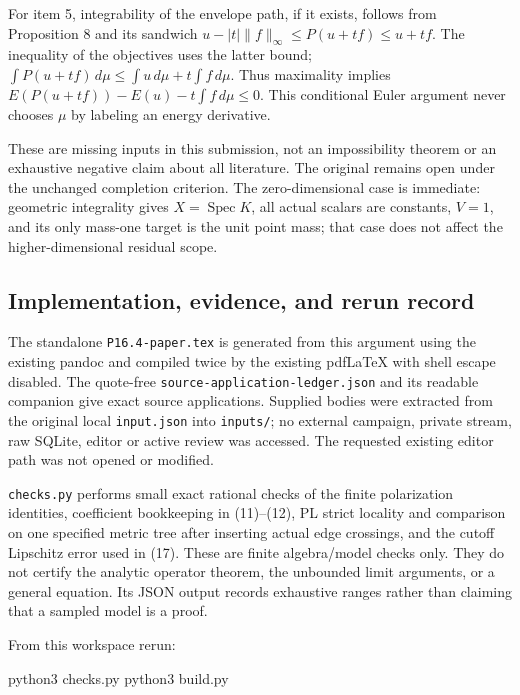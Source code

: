\documentclass[
]{article}
\newenvironment{Shaded}{}{}
\newcommand{\ExtensionTok}[1]{#1}
\newcommand{\NormalTok}[1]{#1}
\begin{document}
For item 5, integrability of the envelope path, if it exists, follows
from Proposition 8 and its sandwich
\(u-|t|\|f\|_\infty\leq P(u+tf)\leq u+tf\). The inequality of the
objectives uses the latter bound;
\(\int P(u+tf)\,d\mu\leq\int u\,d\mu+t\int f\,d\mu\). Thus maximality
implies \(E(P(u+tf))-E(u)-t\int f\,d\mu\leq0\). This conditional Euler
argument never chooses \(\mu\) by labeling an energy derivative.

These are missing inputs in this submission, not an impossibility
theorem or an exhaustive negative claim about all literature. The
original remains open under the unchanged completion criterion. The
zero-dimensional case is immediate: geometric integrality gives
\(X=\operatorname{Spec}K\), all actual scalars are constants, \(V=1\),
and its only mass-one target is the unit point mass; that case does not
affect the higher-dimensional residual scope.

\subsection{Implementation, evidence, and rerun
record}\label{implementation-evidence-and-rerun-record}

The standalone \texttt{P16.4-paper.tex} is generated from this argument
using the existing pandoc and compiled twice by the existing pdfLaTeX
with shell escape disabled. The quote-free
\texttt{source-application-ledger.json} and its readable companion give
exact source applications. Supplied bodies were extracted from the
original local \texttt{input.json} into \texttt{inputs/}; no external
campaign, private stream, raw SQLite, editor or active review was
accessed. The requested existing editor path was not opened or modified.

\texttt{checks.py} performs small exact rational checks of the finite
polarization identities, coefficient bookkeeping in (11)--(12), PL
strict locality and comparison on one specified metric tree after
inserting actual edge crossings, and the cutoff Lipschitz error used in
(17). These are finite algebra/model checks only. They do not certify
the analytic operator theorem, the unbounded limit arguments, or a
general equation. Its JSON output records exhaustive ranges rather than
claiming that a sampled model is a proof.

From this workspace rerun:

\begin{Shaded}
\begin{Highlighting}[]
\ExtensionTok{python3}\NormalTok{ checks.py}
\ExtensionTok{python3}\NormalTok{ build.py}
\end{Highlighting}
\end{Shaded}
\end{document}

